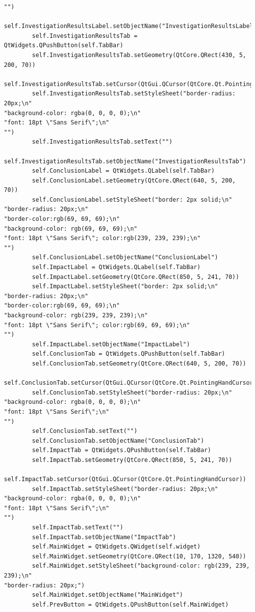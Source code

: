 \documentclass{article}
\begin{document}
\begin{lstlisting}
"")
        self.InvestigationResultsLabel.setObjectName("InvestigationResultsLabel")
        self.InvestigationResultsTab = QtWidgets.QPushButton(self.TabBar)
        self.InvestigationResultsTab.setGeometry(QtCore.QRect(430, 5, 200, 70))
        self.InvestigationResultsTab.setCursor(QtGui.QCursor(QtCore.Qt.PointingHandCursor))
        self.InvestigationResultsTab.setStyleSheet("border-radius: 20px;\n"
"background-color: rgba(0, 0, 0, 0);\n"
"font: 18pt \"Sans Serif\";\n"
"")
        self.InvestigationResultsTab.setText("")
        self.InvestigationResultsTab.setObjectName("InvestigationResultsTab")
        self.ConclusionLabel = QtWidgets.QLabel(self.TabBar)
        self.ConclusionLabel.setGeometry(QtCore.QRect(640, 5, 200, 70))
        self.ConclusionLabel.setStyleSheet("border: 2px solid;\n"
"border-radius: 20px;\n"
"border-color:rgb(69, 69, 69);\n"
"background-color: rgb(69, 69, 69);\n"
"font: 18pt \"Sans Serif\"; color:rgb(239, 239, 239);\n"
"")
        self.ConclusionLabel.setObjectName("ConclusionLabel")
        self.ImpactLabel = QtWidgets.QLabel(self.TabBar)
        self.ImpactLabel.setGeometry(QtCore.QRect(850, 5, 241, 70))
        self.ImpactLabel.setStyleSheet("border: 2px solid;\n"
"border-radius: 20px;\n"
"border-color:rgb(69, 69, 69);\n"
"background-color: rgb(239, 239, 239);\n"
"font: 18pt \"Sans Serif\"; color:rgb(69, 69, 69);\n"
"")
        self.ImpactLabel.setObjectName("ImpactLabel")
        self.ConclusionTab = QtWidgets.QPushButton(self.TabBar)
        self.ConclusionTab.setGeometry(QtCore.QRect(640, 5, 200, 70))
        self.ConclusionTab.setCursor(QtGui.QCursor(QtCore.Qt.PointingHandCursor))
        self.ConclusionTab.setStyleSheet("border-radius: 20px;\n"
"background-color: rgba(0, 0, 0, 0);\n"
"font: 18pt \"Sans Serif\";\n"
"")
        self.ConclusionTab.setText("")
        self.ConclusionTab.setObjectName("ConclusionTab")
        self.ImpactTab = QtWidgets.QPushButton(self.TabBar)
        self.ImpactTab.setGeometry(QtCore.QRect(850, 5, 241, 70))
        self.ImpactTab.setCursor(QtGui.QCursor(QtCore.Qt.PointingHandCursor))
        self.ImpactTab.setStyleSheet("border-radius: 20px;\n"
"background-color: rgba(0, 0, 0, 0);\n"
"font: 18pt \"Sans Serif\";\n"
"")
        self.ImpactTab.setText("")
        self.ImpactTab.setObjectName("ImpactTab")
        self.MainWidget = QtWidgets.QWidget(self.widget)
        self.MainWidget.setGeometry(QtCore.QRect(10, 170, 1320, 540))
        self.MainWidget.setStyleSheet("background-color: rgb(239, 239, 239);\n"
"border-radius: 20px;")
        self.MainWidget.setObjectName("MainWidget")
        self.PrevButton = QtWidgets.QPushButton(self.MainWidget)

\end{lstlisting}
\end{document}

